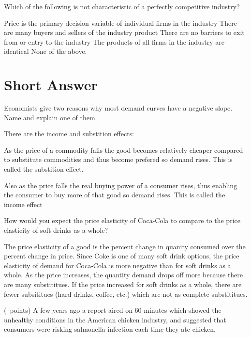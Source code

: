 \begin{questions}
  \question[2] Which of the following is not characteristic of a
  perfectly competitive industry?
  \begin{choices}
    \CorrectChoice Price is the primary decision variable of
    individual firms in the industry
    \choice There are many buyers and sellers of the industry product
    \choice There are no barriers to exit from or entry to the
    industry
    \choice The products of all firms in the industry are identical
    \choice None of the above.
  \end{choices}

  \section{Short Answer}

  \question[5] Economists give two reasons why most demand curves have
  a negative slope. Name and explain one of them.
  \begin{solution}
    There are the income and substition effects:

    As the price of a commodity falls the good becomes relatively
    cheaper compared to substitute commodities and thus become
    prefered so demand rises. This is called the substition effect.

    Also as the price falls the real buying power of a consumer rises,
    thus enabling the consumer to buy more of that good so demand
    rises. This is called the income effect
  \end{solution}

  \question[5] How would you expect the price elasticity of Coca-Cola
  to compare to the price elasticity of soft drinks as a whole?

  \begin{solution}
    The price elasticity of a good is the percent change in quanity
    consumed over the percent change in price. Since Coke is one of
    many soft drink options, the price elasticity of demand for
    Coca-Cola is more negative than for soft drinks as a whole. As the
    price increases, the quantity demand drops off more because there
    are many substititues. If the price increased for soft drinks as a
    whole, there are fewer subsititues (hard drinks, coffee, etc.)
    which are not as complete substititues.
  \end{solution}

  \question (\totalpoints\ points) A few years ago a report aired on
  60 minutes which showed the unhealthy conditions in the American
  chicken industry, and suggested that consumers were risking
  salmonella infection each time they ate chicken.


\end{questions}

